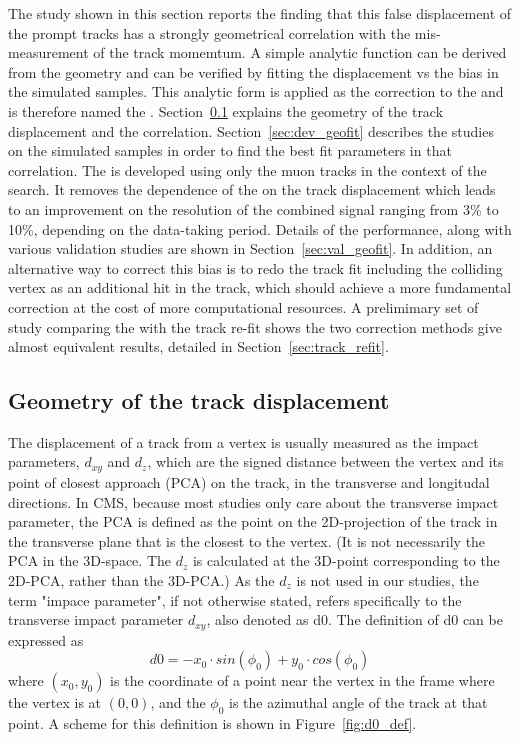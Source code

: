 The study shown in this section reports the finding that this false displacement of the prompt tracks
has a strongly geometrical correlation with the mis-measurement of the track momemtum.
A simple analytic function can be derived from the geometry and can be verified by 
fitting the displacement vs the \pt bias in the simulated samples.
This analytic form is applied as the correction to the \pt and is therefore named the \GeoFit.
Section~\ref{sec:d0_geometry} explains the geometry of the track displacement and the correlation.
Section~\ref{sec:dev_geofit} describes the studies on the simulated samples in order to find the best fit parameters in that correlation.
The \GeoFit is developed using only the muon tracks in the context of the \hmm search.
It removes the dependence of the \mmm on the track displacement which leads to an 
improvement on the \mmm resolution of the combined signal ranging from 3\% to 10\%, depending on the data-taking period.
Details of the \GeoFit performance, along with various validation studies are shown in Section~\ref{sec:val_geofit}.
In addition, an alternative way to correct this \pt bias is to redo the track fit including the colliding vertex as an additional hit in the track, 
which should achieve a more fundamental correction at the cost of more computational resources.
A prelimimary set of study comparing the \GeoFit with the track re-fit shows the two correction methods give almost equivalent results,
detailed in Section~\ref{sec:track_refit}.



\subsection{Geometry of the track displacement}\label{sec:d0_geometry}

The displacement of a track from a vertex is usually measured as the impact parameters, $d_{xy}$ and $d_{z}$,
which are the signed distance between the vertex and its point of closest approach (PCA) on the track, in the transverse and longitudal directions.
In CMS, because most studies only care about the transverse impact parameter, 
the PCA is defined as the point on the 2D-projection of the track in the transverse plane that is the closest to the vertex.
(It is not necessarily the PCA in the 3D-space. The $d_{z}$ is calculated at the 3D-point corresponding to the 2D-PCA, rather than the 3D-PCA.)
As the $d_{z}$ is not used in our studies, the term "impace parameter", if not otherwise stated,
refers specifically to the transverse impact parameter $d_{xy}$, also denoted as d0.
The definition of d0 can be expressed as 
\begin{equation}\label{eq:d0_def}
  d0 = -x_{0} \cdot sin(\phi_{0}) + y_{0} \cdot cos(\phi_{0})
\end{equation}
where $(x_{0}, y_{0})$ is the coordinate of a point near the vertex in the frame where the vertex is at $(0,0)$, 
and the $\phi_{0}$ is the azimuthal angle of the track at that point.
A scheme for this definition is shown in Figure~\ref{fig:d0_def}.


